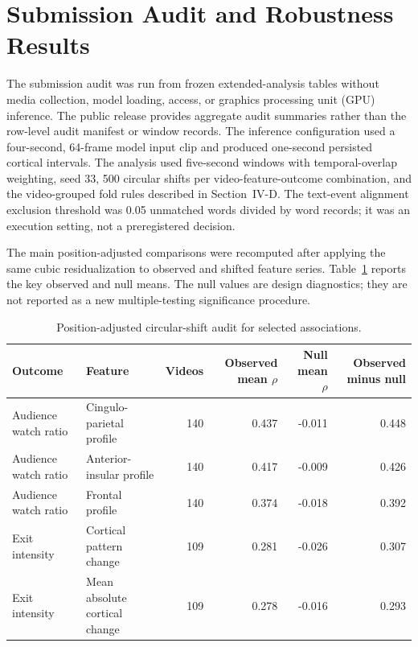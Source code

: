 \section{Submission Audit and Robustness Results}
\label{app:audit}

The submission audit was run from frozen extended-analysis tables without media collection, model loading,  access, or graphics processing unit (GPU) inference. The public release provides aggregate audit summaries rather than the row-level audit manifest or window records. The inference configuration used a four-second, 64-frame model input clip and produced one-second persisted cortical intervals. The analysis used five-second windows with temporal-overlap weighting, seed 33, 500 circular shifts per video-feature-outcome combination, and the video-grouped fold rules described in Section~IV-D. The text-event alignment exclusion threshold was 0.05 unmatched words divided by word records; it was an execution setting, not a preregistered decision.

The main position-adjusted comparisons were recomputed after applying the same cubic residualization to observed and shifted feature series. Table~\ref{tab:null} reports the key observed and null means. The null values are design diagnostics; they are not reported as a new multiple-testing significance procedure. 

\begin{table}[!t]
\caption{Position-adjusted circular-shift audit for selected associations.}
\label{tab:null}
\centering
\renewcommand{\arraystretch}{1.1}
\tablebodyfont
\begin{tabular}{@{}llrrrr@{}}
\toprule
Outcome & Feature & Videos & Observed mean $\rho$ & Null mean $\rho$ & Observed minus null \\
\midrule
Audience watch ratio & Cingulo-parietal profile & 140 & 0.437 & -0.011 & 0.448 \\
Audience watch ratio & Anterior-insular profile & 140 & 0.417 & -0.009 & 0.426 \\
Audience watch ratio & Frontal profile & 140 & 0.374 & -0.018 & 0.392 \\
Exit intensity & Cortical pattern change & 109 & 0.281 & -0.026 & 0.307 \\
Exit intensity & Mean absolute cortical change & 109 & 0.278 & -0.016 & 0.293 \\
\bottomrule
\end{tabular}
\end{table}


